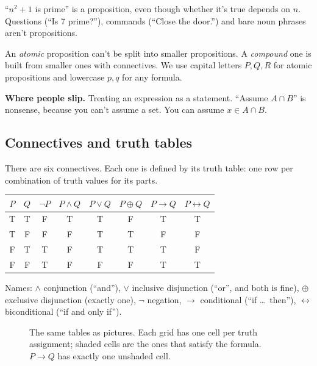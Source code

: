 ``$n^2+1$ is prime'' is a proposition, even though whether it's true depends on $n$. Questions (``Is 7 prime?''), commands (``Close the door.'') and bare noun phrases aren't propositions.

An \emph{atomic} proposition can't be split into smaller propositions. A \emph{compound} one is built from smaller ones with connectives. We use capital letters $P,Q,R$ for atomic propositions and lowercase $p,q$ for any formula.

\textbf{Where people slip.} Treating an expression as a statement. ``Assume $A\cap B$'' is nonsense, because you can't assume a set. You can assume $x\in A\cap B$.

\subsection{Connectives and truth tables}

There are six connectives. Each one is defined by its truth table: one row per combination of truth values for its parts.

\begin{center}
\begin{tabular}{cc|c|ccccc}
\toprule
$P$ & $Q$ & $\lnot P$ & $P\land Q$ & $P\lor Q$ & $P\oplus Q$ & $P\to Q$ & $P\leftrightarrow Q$\\
\midrule
T & T & F & T & T & F & T & T\\
T & F & F & F & T & T & F & F\\
F & T & T & F & T & T & T & F\\
F & F & T & F & F & F & T & T\\
\bottomrule
\end{tabular}
\end{center}

Names: $\land$ conjunction (``and''), $\lor$ inclusive disjunction (``or'', and both is fine), $\oplus$ exclusive disjunction (exactly one), $\lnot$ negation, $\to$ conditional (``if \dots\ then''), $\leftrightarrow$ biconditional (``if and only if'').

\begin{figure}[htb]
\centering
{}
\caption{The same tables as pictures. Each grid has one cell per truth assignment; shaded cells are the ones that satisfy the formula. $P\to Q$ has exactly one unshaded cell.}
\end{figure}

